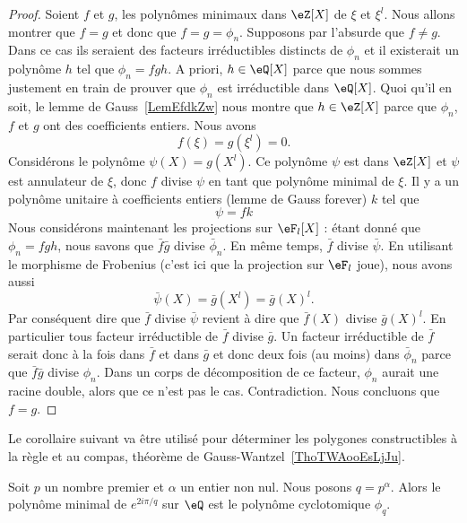 \begin{proof}
    Soient \( f\) et \( g\), les polynômes minimaux dans \( \eZ[X]\) de \( \xi\) et \( \xi^l\). Nous allons montrer que \( f=g\) et donc que \( f=g=\phi_n\). Supposons par l'absurde que \( f\neq g\). Dans ce cas ils seraient des facteurs irréductibles distincts de \( \phi_n\) et il existerait un polynôme \( h\) tel que \( \phi_n=fgh\). A priori, \( h\in \eQ[X]\) parce que nous sommes justement en train de prouver que \( \phi_n\) est irréductible dans \( \eQ[X]\). Quoi qu'il en soit, le lemme de Gauss~\ref{LemEfdkZw} nous montre que \( h\in \eZ[X]\) parce que \( \phi_n\), \( f\) et \( g\) ont des coefficients entiers. Nous avons
    \begin{equation}
        f(\xi)=g(\xi^l)=0.
    \end{equation}
    Considérons le polynôme \( \psi(X)=g(X^l)\). Ce polynôme \( \psi\) est dans \( \eZ[X]\) et \( \psi\) est annulateur de \( \xi\), donc \( f\) divise \( \psi\) en tant que polynôme minimal de \( \xi\). Il y a un polynôme unitaire à coefficients entiers (lemme de Gauss forever) \( k\) tel que
    \begin{equation}
        \psi=fk
    \end{equation}
    Nous considérons maintenant les projections sur \( \eF_l[X]\) : étant donné que \( \phi_n=fgh\), nous savons que \( \bar f\bar g\) divise \( \bar\phi_n\). En même temps, \( \bar f\) divise \( \bar \psi\). En utilisant le morphisme de Frobenius (c'est ici que la projection sur \( \eF_l\) joue), nous avons aussi
    \begin{equation}
        \bar\psi(X)=\bar g(X^l)=\bar g(X)^l.
    \end{equation}
    Par conséquent dire que \( \bar f\) divise \( \bar\psi\) revient à dire que \( \bar f(X)\) divise \( \bar g(X)^l\). En particulier tous facteur irréductible de \( \bar f\) divise \( \bar g\). Un facteur irréductible de \( \bar f\) serait donc à la fois dans \( \bar f\) et dans \( \bar g\) et donc deux fois (au moins) dans \( \bar\phi_n\) parce que \( \bar f\bar g\) divise \( \phi_n\). Dans un corps de décomposition de ce facteur, \( \phi_n\) aurait une racine double, alors que ce n'est pas le cas. Contradiction. Nous concluons que \( f=g\).
\end{proof}

Le corollaire suivant va être utilisé pour déterminer les polygones constructibles à la règle et au compas, théorème de Gauss-Wantzel~\ref{ThoTWAooEsLjJu}.
\begin{corollary}   \label{CorKRTooTJtyvP}
    Soit \( p\) un nombre premier et \( \alpha\) un entier non nul. Nous posons \( q=p^{\alpha}\). Alors le polynôme minimal de \(  e^{2 i\pi/q}\) sur \( \eQ\) est le polynôme cyclotomique \( \phi_q\).
\end{corollary}

